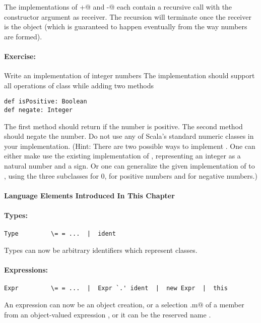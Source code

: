 \documentclass[11pt]{book}
\newcommand{\exercise}{\paragraph{Exercise:}}
\begin{document}
The implementations of \verb@+@ and \verb@-@ each contain a recursive
call with the constructor argument as receiver. The recursion will
terminate once the receiver is the \verb@Zero@ object (which is
guaranteed to happen eventually from the way numbers are formed).

\exercise Write an implementation \verb@Integer@ of integer numbers
The implementation should support all operations of class \verb@Nat@
while adding two methods
\begin{verbatim}
def isPositive: Boolean
def negate: Integer
\end{verbatim}
The first method should return \verb@true@ if the number is positive. The second method should negate the number.
Do not use any of Scala's standard numeric classes in your
implementation. (Hint: There are two possible ways to implement
\verb@Integer@. One can either make use the existing implementation of
\verb@Nat@, representing an integer as a natural number and a sign.
Or one can generalize the given implementation of \verb@Nat@ to
\verb@Integer@, using the three subclasses \verb@Zero@ for 0, 
\verb@Succ@ for positive numbers and \verb@Pred@ for negative numbers.)



\paragraph{Language Elements Introduced In This Chapter}

\paragraph{Types:}
\begin{verbatim}
Type         \= = ...  |  ident
\end{verbatim}

Types can now be arbitrary identifiers which represent classes.

\paragraph{Expressions:}
\begin{verbatim}
Expr         \= = ...  |  Expr `.' ident  |  new Expr  |  this
\end{verbatim}

An expression can now be an object creation, or
a selection \verb@E.m@ of a member \verb@m@
from an object-valued expression \verb@E@, or it can be the reserved name \verb@this@.
\end{document}
